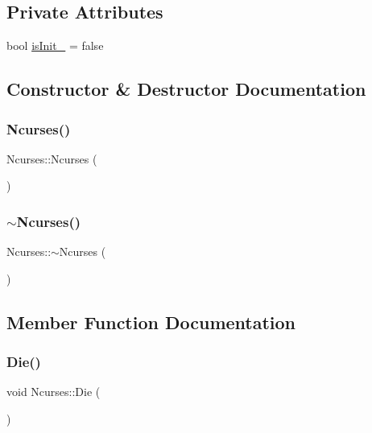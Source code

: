 \subsection*{Private Attributes}
\begin{DoxyCompactItemize}
\item 
bool \mbox{\hyperlink{classNcurses_adce6b18f601709b3843fb36fa7b91764}{is\+Init\+\_\+}} = false
\end{DoxyCompactItemize}


\subsection{Constructor \& Destructor Documentation}
\mbox{\label{classNcurses_a2565bd187834633fd68b595184ee2acf}} 
\subsubsection{\texorpdfstring{Ncurses()}{Ncurses()}}
{\footnotesize\ttfamily Ncurses\+::\+Ncurses (\begin{DoxyParamCaption}{ }\end{DoxyParamCaption})}

\mbox{\label{classNcurses_a4197da9eb0dafba570c2f60a6ce0124e}} 
\subsubsection{\texorpdfstring{$\sim$\+Ncurses()}{~Ncurses()}}
{\footnotesize\ttfamily Ncurses\+::$\sim$\+Ncurses (\begin{DoxyParamCaption}{ }\end{DoxyParamCaption})\hspace{0.3cm}{\ttfamily [virtual]}}



\subsection{Member Function Documentation}
\mbox{\label{classNcurses_af9467a004e66043d4dbe540e24524f1f}} 
\subsubsection{\texorpdfstring{Die()}{Die()}}
{\footnotesize\ttfamily void Ncurses\+::\+Die (\begin{DoxyParamCaption}{ }\end{DoxyParamCaption})}

